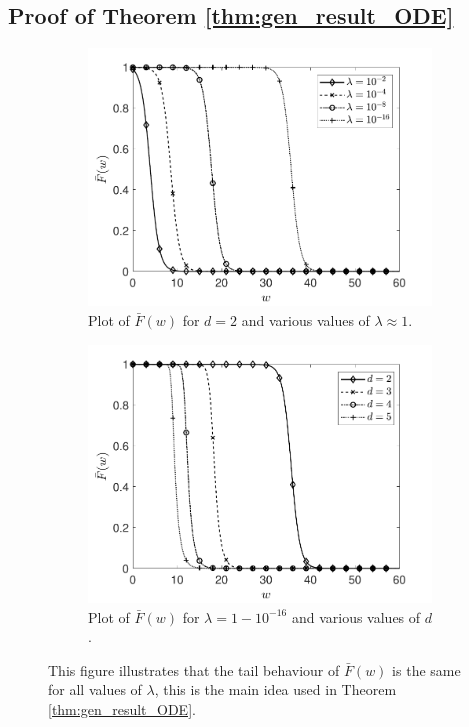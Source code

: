 \documentclass[12pt]{report}
\begin{document}
\subsection{Proof of Theorem \ref{thm:gen_result_ODE}} \label{sec:proof}
\begin{figure}[t]
\begin{subfigure}{0.45\textwidth}
\centering
\captionsetup{width=.8\linewidth}
\includegraphics[width=1\linewidth]{figures/Chapter5/fig0a.pdf}
\caption{ Plot of $\bar F(w)$ for $d=2$ and various values of $\lambda \approx 1$.}
\label{fig0a}
\end{subfigure}
\begin{subfigure}{0.45\textwidth}
\centering
\captionsetup{width=.8\linewidth}
\includegraphics[width=1\linewidth]{figures/Chapter5/fig0b.pdf}
\caption{ Plot of $\bar F(w)$ for $\lambda = 1-10^{-16}$ and various values of $d$.}
\label{fig0b}
\end{subfigure}
\caption{This figure illustrates that the tail behaviour of $\bar F(w)$ is the same for all values of $\lambda$, this is the main idea used in Theorem \ref{thm:gen_result_ODE}.}
\label{fig0}
\end{figure}
\end{document}
